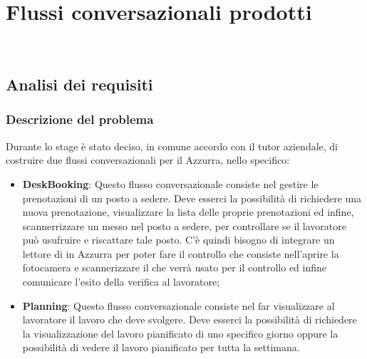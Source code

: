 
\chapter{Flussi conversazionali prodotti}
\label{cap:flussi di conversazione}

\\

\section{Analisi dei requisiti}
\subsection{Descrizione del problema}
Durante lo stage è stato deciso, in comune accordo con il tutor aziendale, di costruire due flussi conversazionali per il  Azzurra, nello specifico:
\begin{itemize}
	\item \textbf{DeskBooking}: Questo flusso conversazionale consiste nel gestire le prenotazioni di un posto a sedere. Deve esserci la possibilità di richiedere una nuova prenotazione, visualizzare la lista delle proprie prenotazioni ed infine, scannerrizzare un  messo nel posto a sedere, per controllare se il lavoratore può usufruire e riscattare tale posto. C'è quindi bisogno di integrare un lettore di  in Azzurra per poter fare il controllo che consiste nell'aprire la fotocamera e scannerizzare il  che verrà usato per il controllo ed infine comunicare l'esito della verifica al lavoratore;
	\item \textbf{Planning}: Questo flusso conversazionale consiste nel far visualizzare al lavoratore il lavoro che deve svolgere. Deve esserci la possibilità di richiedere la visualizzazione del lavoro pianificato di uno specifico giorno oppure la possibilità di vedere il lavoro pianificato per tutta la settimana.
\end{itemize}
